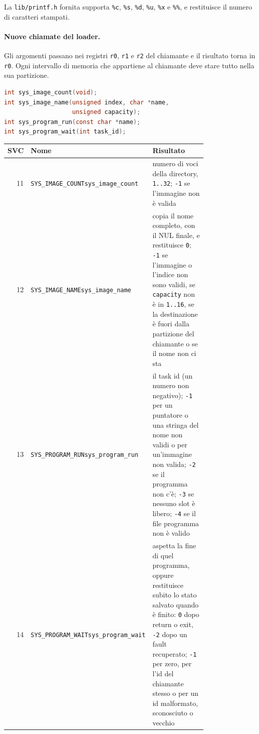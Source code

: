 La \texttt{lib/printf.h} fornita supporta \texttt{\%c}, \texttt{\%s}, \texttt{\%d}, \texttt{\%u}, \texttt{\%x} e \texttt{\%\%}, e restituisce il numero di caratteri stampati.

\paragraph{Nuove chiamate del loader.} Gli argomenti passano nei registri \texttt{r0}, \texttt{r1} e \texttt{r2} del chiamante e il risultato torna in \texttt{r0}. Ogni intervallo di memoria che appartiene al chiamante deve stare tutto nella sua partizione.
\begin{lstlisting}[language=C]
int sys_image_count(void);
int sys_image_name(unsigned index, char *name,
                   unsigned capacity);
int sys_program_run(const char *name);
int sys_program_wait(int task_id);
\end{lstlisting}

\begin{center}
\small
\begin{tabular}{|r|p{0.27\linewidth}|p{0.52\linewidth}|}
\hline
SVC & \raggedright Nome & \raggedright Risultato \tabularnewline
\hline\hline
11 & \raggedright \texttt{SYS\_IMAGE\_COUNT}\newline\texttt{sys\_image\_count} & \raggedright numero di voci della directory, \texttt{1..32}; \texttt{-1} se l'immagine non è valida \tabularnewline
\hline
12 & \raggedright \texttt{SYS\_IMAGE\_NAME}\newline\texttt{sys\_image\_name} & \raggedright copia il nome completo, con il NUL finale, e restituisce \texttt{0}; \texttt{-1} se l'immagine o l'indice non sono validi, se \texttt{capacity} non è in \texttt{1..16}, se la destinazione è fuori dalla partizione del chiamante o se il nome non ci sta \tabularnewline
\hline
13 & \raggedright \texttt{SYS\_PROGRAM\_RUN}\newline\texttt{sys\_program\_run} & \raggedright il task id (un numero non negativo); \texttt{-1} per un puntatore o una stringa del nome non validi o per un'immagine non valida; \texttt{-2} se il programma non c'è; \texttt{-3} se nessuno slot è libero; \texttt{-4} se il file programma non è valido \tabularnewline
\hline
14 & \raggedright \texttt{SYS\_PROGRAM\_WAIT}\newline\texttt{sys\_program\_wait} & \raggedright aspetta la fine di quel programma, oppure restituisce subito lo stato salvato quando è finito: \texttt{0} dopo return o exit, \texttt{-2} dopo un fault recuperato; \texttt{-1} per zero, per l'id del chiamante stesso o per un id malformato, sconosciuto o vecchio \tabularnewline
\hline
\end{tabular}
\end{center}

